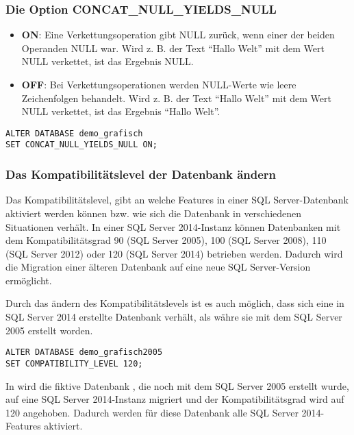         \subsubsection{Die Option CONCAT\_NULL\_YIELDS\_NULL}
          \begin{itemize}
              \item \textbf{ON}: Eine Verkettungsoperation gibt NULL zurück,
              wenn einer der beiden Operanden NULL war. Wird z. B. der Text
              \enquote{Hallo Welt} mit dem Wert NULL verkettet, ist das
              Ergebnis NULL.
              \item \textbf{OFF}: Bei Verkettungsoperationen werden NULL-Werte
              wie leere Zeichenfolgen behandelt. Wird z. B. der Text
              \enquote{Hallo Welt} mit dem Wert NULL verkettet, ist das Ergebnis
              \enquote{Hallo Welt}.
          \end{itemize}
          \begin{lstlisting}[language=ms_sql,caption={Behandlung
          von NULL-Werten bei Verkettungsoperationen steuern},label=admin03_17]
ALTER DATABASE demo_grafisch 
SET CONCAT_NULL_YIELDS_NULL ON;
          \end{lstlisting}          
        \subsubsection{Das Kompatibilitätslevel der Datenbank ändern}        
          Das Kompatibilitätslevel, gibt an welche Features in einer SQL
          Server-Datenbank aktiviert werden können bzw. wie sich die Datenbank
          in verschiedenen Situationen verhält. In einer SQL Server 2014-Instanz
          können Datenbanken mit dem Kompatibilitätsgrad 90 (SQL Server 2005),
          100 (SQL Server 2008), 110 (SQL Server 2012) oder 120 (SQL
          Server 2014) betrieben werden. Dadurch wird die Migration einer
          älteren Datenbank auf eine neue SQL Server-Version ermöglicht.
          
          Durch das ändern des Kompatibilitätslevels ist es auch möglich, dass
          sich eine in SQL Server 2014 erstellte Datenbank verhält, als währe
          sie mit dem SQL Server 2005 erstellt worden.
          \begin{lstlisting}[language=ms_sql,caption={Ändern
          des Kompatibilitätslevels einer Datenbank},label=admin03_18]
ALTER DATABASE demo_grafisch2005
SET COMPATIBILITY_LEVEL 120;
          \end{lstlisting}
          In  wird die fiktive Datenbank
          , die noch mit dem SQL Server 2005
          erstellt wurde, auf eine SQL Server 2014-Instanz migriert und der
          Kompatibilitätsgrad wird auf 120 angehoben. Dadurch werden f\"ur diese
          Datenbank alle SQL Server 2014-Features aktiviert.          
